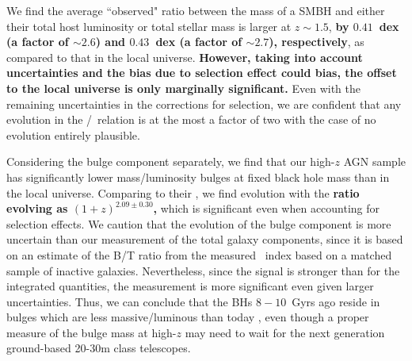 \documentclass[apj]{emulateapj}
\begin{document}
We find the average ``observed" ratio between the mass of a SMBH and either their total host luminosity or total stellar mass is larger at $z\sim1.5$, {\bf by $0.41$~dex (a factor of $\sim2.6$) and  $0.43$~dex (a factor of $\sim2.7$), respectively}, as compared to that in the local universe. 
{\bf However, taking into account uncertainties and the bias due to selection effect could bias, the offset to the local universe is only marginally significant.} 
Even with the remaining uncertainties in the corrections for selection, we are confident that any evolution in the \mbh/\smass\ relation is at the most a factor of two with the case of no evolution entirely plausible.

Considering the bulge component \citep{Bennert11, Woo++08} separately, we find that our high-$z$ AGN sample has significantly lower mass/luminosity bulges at fixed black hole mass than in the local universe. Comparing to their \mbh, we find evolution with the {\bf ratio evolving as $(1+z)^{2.09\pm0.30}$,} which is significant even when accounting for selection effects. We caution that the evolution of the bulge component is more uncertain than our measurement of the total galaxy components, since it is based on an estimate of the B/T ratio from the measured \sersic\ index based on a matched sample of inactive galaxies. Nevertheless, since the signal is stronger than for the integrated quantities, the measurement is more significant even given larger uncertainties.
Thus, we can conclude that the BHs $8-10$~Gyrs ago reside in bulges which are less massive/luminous than today \citep[see also][]{Bennert11,Park15}, even though a proper measure of the bulge mass at high-$z$ may need to wait for the next generation ground-based 20-30m class telescopes.
\end{document}
